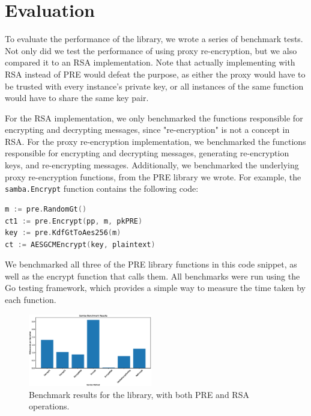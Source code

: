 \section{Evaluation}
\label{sec:evaluation}


To evaluate the performance of the \SystemName library, we wrote a series of benchmark tests.
Not only did we test the performance of \SystemName using proxy re-encryption, but we also compared it to an RSA implementation.
Note that actually implementing \SystemName with RSA instead of PRE would defeat the purpose, as either the proxy would have to be trusted with every instance's private key, or all instances of the same function would have to share the same key pair.

For the RSA implementation, we only benchmarked the \SystemName functions responsible for encrypting and decrypting messages, since "re-encryption" is not a concept in RSA.
For the proxy re-encryption implementation, we benchmarked the \SystemName functions responsible for encrypting and decrypting messages, generating re-encryption keys, and re-encrypting messages.
Additionally, we benchmarked the underlying proxy re-encryption functions, from the PRE library we wrote.
For example, the \texttt{samba.Encrypt} function contains the following code:
\begin{lstlisting}[language=Go]
m := pre.RandomGt()
ct1 := pre.Encrypt(pp, m, pkPRE)
key := pre.KdfGtToAes256(m)
ct := AESGCMEncrypt(key, plaintext)
\end{lstlisting}
We benchmarked all three of the PRE library functions in this code snippet, as well as the \SystemName encrypt function that calls them.
All benchmarks were run using the Go testing framework, which provides a simple way to measure the time taken by each function.

\begin{figure}
	\centering
	\includegraphics[width=0.48\textwidth]{figs/samba-bench}
	\caption{Benchmark results for the \SystemName library, with both PRE and RSA operations.}
	\label{fig:samba-bench}
\end{figure}

